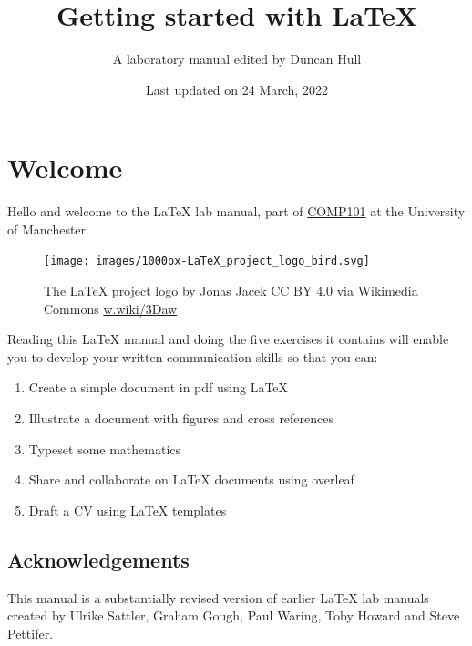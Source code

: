 \documentclass[
]{book}
\title{Getting started with LaTeX}
\author{A laboratory manual edited by Duncan Hull}
\date{Last updated on 24 March, 2022}
\providecommand{\tightlist}{%
  \setlength{\itemsep}{0pt}\setlength{\parskip}{0pt}}
\begin{document}
\maketitle

{
\setcounter{tocdepth}{1}
\tableofcontents
}
\hypertarget{welcome}{%
\chapter*{Welcome}\label{welcome}}

Hello and welcome to the LaTeX lab manual, part of \href{https://studentnet.cs.manchester.ac.uk/ugt/COMP10120/syllabus/}{COMP101} at the University of Manchester.

\begin{figure}

{\centering \texttt{[image: images/1000px-LaTeX\_project\_logo\_bird.svg]} 

}

\caption{The LaTeX project logo by \href{https://www.jonas.me/}{Jonas Jacek} CC BY 4.0 via Wikimedia Commons \href{https://w.wiki/3Daw}{w.wiki/3Daw}}\label{fig:latexproject-fig}
\end{figure}



Reading this LaTeX manual and doing the five exercises it contains will enable you to develop your written communication skills so that you can:

\begin{enumerate}
\def\labelenumi{\arabic{enumi}.}
\tightlist
\item
  Create a simple document in pdf using LaTeX
\item
  Illustrate a document with figures and cross references
\item
  Typeset some mathematics
\item
  Share and collaborate on LaTeX documents using overleaf
\item
  Draft a CV using LaTeX templates
\end{enumerate}

\hypertarget{acknowledgements}{%
\section*{Acknowledgements}\label{acknowledgements}}

This manual is a substantially revised version of earlier LaTeX lab manuals created by Ulrike Sattler, Graham Gough, Paul Waring, Toby Howard and Steve Pettifer.
\end{document}

